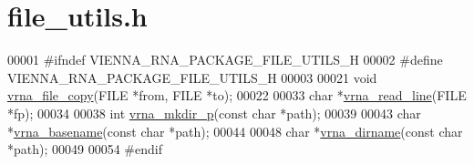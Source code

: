 \hypertarget{file__utils_8h_source}{}\section{file\+\_\+utils.\+h}
\label{file__utils_8h_source}

\begin{DoxyCode}
00001 \textcolor{preprocessor}{#ifndef VIENNA\_RNA\_PACKAGE\_FILE\_UTILS\_H}
00002 \textcolor{preprocessor}{#define VIENNA\_RNA\_PACKAGE\_FILE\_UTILS\_H}
00003 
00021 \textcolor{keywordtype}{void} \hyperlink{group__file__utils_ga4382a56d2fee9ed738364b99329edc7c}{vrna\_file\_copy}(FILE *from, FILE *to);
00022 
00033 \textcolor{keywordtype}{char}  *\hyperlink{group__file__utils_gad16c270b70a77c753088b29de8a802dc}{vrna\_read\_line}(FILE *fp);
00034 
00038 \textcolor{keywordtype}{int} \hyperlink{group__file__utils_gacfa44a974272a4d42c5d391cc780a0ec}{vrna\_mkdir\_p}(\textcolor{keyword}{const} \textcolor{keywordtype}{char} *path);
00039 
00043 \textcolor{keywordtype}{char} *\hyperlink{group__file__utils_ga8d0f8f84f1e2628172cf3c8648b2e507}{vrna\_basename}(\textcolor{keyword}{const} \textcolor{keywordtype}{char} *path);
00044 
00048 \textcolor{keywordtype}{char} *\hyperlink{group__file__utils_gae006d31b088d52d8aace86948def5fe8}{vrna\_dirname}(\textcolor{keyword}{const} \textcolor{keywordtype}{char} *path);
00049 
00054 \textcolor{preprocessor}{#endif}
\end{DoxyCode}
